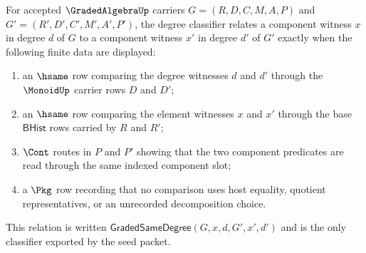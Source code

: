 \begin{definition}
\label{def:gradedalgebra-degree-classifier}
For accepted $\GradedAlgebraUp$ carriers $G=(R,D,C,M,A,P)$ and $G'=(R',D',C',M',A',P')$, the degree classifier relates a component witness $x$ in degree $d$ of $G$ to a component witness $x'$ in degree $d'$ of $G'$ exactly when the following finite data are displayed:
\begin{enumerate}
\item an $\hsame$ row comparing the degree witnesses $d$ and $d'$ through the $\MonoidUp$ carrier rows $D$ and $D'$;
\item an $\hsame$ row comparing the element witnesses $x$ and $x'$ through the base $\mathsf{BHist}$ rows carried by $R$ and $R'$;
\item $\Cont$ routes in $P$ and $P'$ showing that the two component predicates are read through the same indexed component slot;
\item a $\Pkg$ row recording that no comparison uses host equality, quotient representatives, or an unrecorded decomposition choice.
\end{enumerate}
This relation is written $\mathsf{GradedSameDegree}(G,x,d,G',x',d')$ and is the only classifier exported by the seed packet.
\end{definition}

